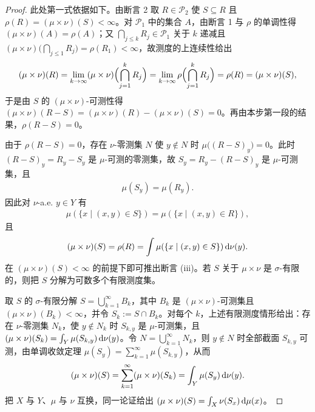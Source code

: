 \documentclass[../../main.tex]{subfiles}%
\begin{document}
\begin{proof}
此处第一式依据如下。由断言 2 取 $R\in\mathcal{P}_2$ 使 $S\subseteq R$ 且 $\rho(R)=(\mu\times\nu)(S)<\infty$。对 $\mathcal{P}_1$ 中的集合 $A$，由断言 1 与 $\rho$ 的单调性得 $(\mu\times\nu)(A)=\rho(A)$；又 $\bigcap_{j\leqslant k}R_j\in\mathcal{P}_1$ 关于 $k$ 递减且 $(\mu\times\nu)\bigl(\bigcap_{j\leqslant 1}R_j\bigr)=\rho(R_1)<\infty$，故测度的上连续性给出
\begin{align*}
(\mu\times\nu)(R)=\lim_{k\to\infty}(\mu\times\nu)\Bigl(\bigcap_{j=1}^{k}R_j\Bigr)=\lim_{k\to\infty}\rho\Bigl(\bigcap_{j=1}^{k}R_j\Bigr)=\rho(R)=(\mu\times\nu)(S),
\end{align*}
于是由 $S$ 的 $(\mu\times\nu)$-可测性得 $(\mu\times\nu)(R-S)=(\mu\times\nu)(R)-(\mu\times\nu)(S)=0$。再由本步第一段的结果，$\rho(R-S)=0$。

由于 $\rho(R-S)=0$，存在 $\nu$-零测集 $N$ 使 $y\notin N$ 时 $\mu\bigl((R-S)_y\bigr)=0$。此时 $(R-S)_y=R_y-S_y$ 是 $\mu$-可测的零测集，故 $S_y=R_y-(R-S)_y$ 是 $\mu$-可测集，且
\begin{align*}
\mu(S_y)=\mu(R_y).
\end{align*}
因此对 $\nu$-a.e. $y\in Y$ 有
\begin{align*}
\mu(\{x\mid(x,y)\in S\})=\mu(\{x\mid(x,y)\in R\}),
\end{align*}
且
\begin{align*}
(\mu\times\nu)(S)=\rho(R)=\int\mu(\{x\mid(x,y)\in S\})\,\mathrm{d}\nu(y).
\end{align*}
在 $(\mu\times\nu)(S)<\infty$ 的前提下即可推出断言 (iii)。若 $S$ 关于 $\mu\times\nu$ 是 $\sigma$-有限的，则把 $S$ 分解为可数多个有限测度集。

取 $S$ 的 $\sigma$-有限分解 $S=\bigcup_{k=1}^{\infty}B_k$，其中 $B_k$ 是 $(\mu\times\nu)$-可测集且 $(\mu\times\nu)(B_k)<\infty$，并令 $S_k:=S\cap B_k$。对每个 $k$，上述有限测度情形给出：存在 $\nu$-零测集 $N_k$，使 $y\notin N_k$ 时 $S_{k,y}$ 是 $\mu$-可测集，且 $(\mu\times\nu)(S_k)=\int_Y\mu(S_{k,y})\,\mathrm{d}\nu(y)$。令 $N=\bigcup_{k=1}^{\infty}N_k$，则 $y\notin N$ 时全部截面 $S_{k,y}$ 可测，由单调收敛定理 $\mu(S_y)=\sum_{k=1}^{\infty}\mu(S_{k,y})$，从而
\begin{align*}
(\mu\times\nu)(S)=\sum_{k=1}^{\infty}(\mu\times\nu)(S_k)=\int_Y\mu(S_y)\,\mathrm{d}\nu(y).
\end{align*}
把 $X$ 与 $Y$、$\mu$ 与 $\nu$ 互换，同一论证给出 $(\mu\times\nu)(S)=\int_X\nu(S_x)\,\mathrm{d}\mu(x)$。


\end{proof}
\end{document}
